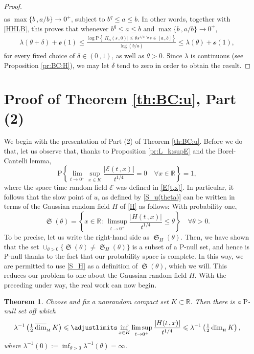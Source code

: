 \documentclass[reqno]{amsart}
\DeclareMathOperator{\dimh}{dim_{_{\rm H}}}
\DeclareMathOperator{\dimm}{\overline{dim}_{_{\rm M}}}
\DeclareMathOperator{\fS}{\mathfrak S}
\newcommand{\<}{\langle}
\renewcommand{\>}{\rangle}
\newcommand{\R}{\mathbb{R}}
\renewcommand{\P}{\mathrm{P}}
\newcommand{\1}{\mathbb{1}}
\renewcommand{\le}{\leqslant}
\newtheorem{theorem}[stat]{Theorem}
\theoremstyle{definition}
\numberwithin{equation}{section}
\begin{document}
\begin{proof}
\begin{align*}
	\end{align*}
	as $\max\{b\,,a/b\}\to0^+$, subject to $b^q \le a \le b$.
	In other words, together with \eqref{HHLB}, this proves that
	whenever $b^q \le a \le b$ and $\max\{b\,,a/b\}\to0^+$,
	\begin{align*}
		\lambda(\theta+\delta)+\mathscr{o}(1) \le 
		\frac{\log\P\left\{ |H_\alpha(s\,,0)|\le \theta s^{1/4}\,\,\forall s\in[a\,,b]\right\}}{\log (b/a)}
		\le \lambda(\theta)+\mathscr{o}(1),
	\end{align*}
	for every fixed choice of
	$\delta\in(0\,,1)$, as well as $\theta>0$. 
	Since $\lambda$ is continuous (see Proposition \ref{pr:BC:H}),
	we may let $\delta$ tend to zero in order to obtain the result.
\end{proof}



\section{Proof of Theorem \ref{th:BC:u}, Part (2)}

We begin with the presentation of Part (2) of Theorem \ref{th:BC:u}.
Before we do that, let us observe that, thanks to Proposition \ref{pr:L_k:supE}
and the Borel-Cantelli lemma,
\[
	\P\left\{ \lim_{t\to0^+} \sup_{x \in K}\frac{|\mathscr{E}(t\,,x)|}{t^{1/4}} =0
	\quad\forall x\in\R\right\}=1,
\]
where the space-time random field $\mathscr{E}$ was defined in \eqref{E(t,x)}.
In particular, it follows that the slow point of $u$, as defined by \eqref{S_u(theta)}
can  be written in terms of the Gaussian random field $H$ of \eqref{H} as 
follows: With probability one,
\begin{equation}\label{S_H}
	\fS(\theta) = \left\{ x\in\R:\ 
	\limsup_{t\to0^+}\frac{|H(t\,,x)|}{t^{1/4}} \le \theta \right\}
	\quad\forall\theta>0.
\end{equation}
To be precise, let us write the right-hand side as
$\fS_H(\theta)$. Then, we have shown that the
set $\cup_{\theta>0}\{\fS(\theta)\neq\fS_H(\theta)\}$ is a subset of
a $\P$-null set, and hence is $\P$-null thanks to the fact that our probability space is
complete.
In this way, we are permitted to use \eqref{S_H} as a definition of $\fS(\theta)$,
which we will. This reduces our problem to one about the Gaussian random field $H$.
With the preceding under way, the real work can now begin.

\begin{theorem}\label{th:H}
	Choose and fix a nonrandom compact set
	$K \subset \R$.
	Then there is a $\P$-null set off which
	\begin{align*}
		\lambda^{-1}\left(\tfrac12 \dimm K \right) \le 
		\adjustlimits \inf_{x \in K} \limsup_{t \to 0^+} \frac{|H(t\,,x)|}{t^{1/4}}
		\le \lambda^{-1}\left( \tfrac12 \dimh K \right),
	\end{align*}
	where $\lambda^{-1}(0) := \inf_{\theta>0}\lambda^{-1}(\theta)=\infty$.
\end{theorem}
\end{document}
